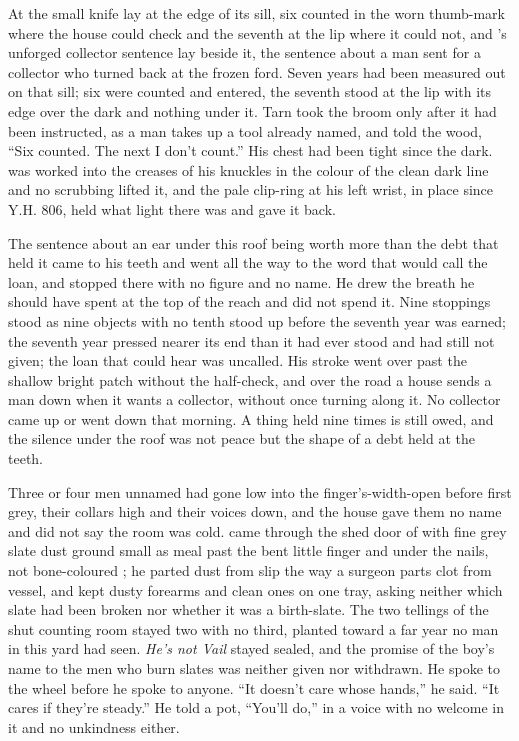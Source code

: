 \scenebreak

At  the small knife lay at the edge of its sill, six counted in the worn thumb-mark where the house could check and the seventh at the lip where it could not, and 's unforged collector sentence lay beside it, the sentence about a man sent for a collector who turned back at the frozen ford. Seven years had been measured out on that sill; six were counted and entered, the seventh stood at the lip with its edge over the dark and nothing under it. Tarn took the broom only after it had been instructed, as a man takes up a tool already named, and told the wood, “Six counted. The next I don't count.” His chest had been tight since the dark.  was worked into the creases of his knuckles in the colour of the clean dark line and no scrubbing lifted it, and the pale clip-ring at his left wrist, in place since Y.H. 806, held what light there was and gave it back.

The sentence about an ear under this roof being worth more than the debt that held it came to his teeth and went all the way to the word that would call the loan, and stopped there with no figure and no name. He drew the breath he should have spent at the top of the reach and did not spend it. Nine stoppings stood as nine objects with no tenth stood up before the seventh year was earned; the seventh year pressed nearer its end than it had ever stood and had still not given; the loan that could hear was uncalled. His stroke went over  past the shallow bright patch without the half-check, and over the road a house sends a man down when it wants a collector, without once turning along it. No collector came up or went down  that morning. A thing held nine times is still owed, and the silence under the roof was not peace but the shape of a debt held at the teeth.

Three or four men unnamed had gone low into the finger's-width-open  before first grey, their collars high and their voices down, and the house gave them no name and did not say the room was cold.  came through the shed door of  with fine grey slate dust ground small as meal past the bent little finger and under the nails, not bone-coloured ; he parted dust from slip the way a surgeon parts clot from vessel, and kept dusty forearms and clean ones on one tray, asking neither which slate had been broken nor whether it was a birth-slate. The two tellings of the shut counting room stayed two with no third, planted toward a far year no man in this yard had seen. \emph{He's not Vail} stayed sealed, and the promise of the boy's name to the men who burn slates was neither given nor withdrawn. He spoke to the wheel before he spoke to anyone. “It doesn't care whose hands,” he said. “It cares if they're steady.” He told a pot, “You'll do,” in a voice with no welcome in it and no unkindness either.

